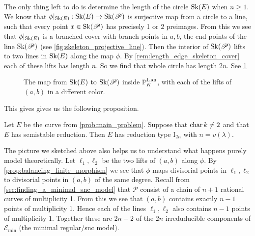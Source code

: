 The only thing left to do is determine the length of the circle $\operatorname{Sk}(E)$ when $n \ge 1$.
We know that $\phi|_{\sk(E)}:\sk (E) \to \sk(\mathscr P)$ is surjective map from a circle to a line, such that every point $x \in \operatorname{Sk}(\mathscr P)$ has precisely 1 or 2 preimages. 
From this we see that $\phi|_{\sk(E)}$ is a branched cover with branch points in $a, b$, the end points of the line $\operatorname{Sk}(\mathscr P)$ (see \cref{fig:skeleton_projective_line}).
Then the interior of $\operatorname{Sk}(\mathscr P)$ lifts to two lines in $\mathscr  {\operatorname{Sk}}(E)$ along the map $\phi$.
By \cref{rem:length_edge_skeleton_cover} each of these lifts has length $n$. 
So we find that whole circle has length $2n$. 
See \cref{fig:map_circle_line}
\begin{figure}[ht]
    \centering
    \caption{The map from $\operatorname{Sk}(E)$ to $\operatorname{Sk}(\mathscr P)$ inside $\mathbb{P}^{1, \text{an}}_K$, with each of the lifts of $(a, b)$ in a different color.}
    \label{fig:map_circle_line}
\end{figure}
This gives gives us the following proposition.
\begin{proposition}
	Let $E$ be the curve from \cref{prob:main_problem}. 
	Suppose that $\operatorname{char} k \ne 2$ and that $E$ has semistable reduction. 
	Then $E$ has reduction type $\mathrm I_{2n}$ with $n = v(\lambda)$. 
\end{proposition}

The picture we sketched above also helps us to understand what happens purely model theoretically. 
Let $\ell_1, \ell_2$ be the two lifts of $(a, b)$ along $\phi$. 
By \cref{prop:balancing_finite_morphism} we see that $\phi$ maps divisorial points in $\ell_1, \ell_2$ to divisorial points in $(a, b)$ of the same degree. 
Recall from \cref{sec:finding_a_minimal_snc_model} that $\mathscr P$ consist of a chain of $n+1$ rational curves of multiplicity 1. 
From this we see that $(a, b)$ contains exactly $n -1$ points of multiplicity 1. 
Hence each of the lines $\ell_1, \ell_2$ also contains $n-1$ points of multiplicity 1.
Together these are $2n - 2$ of the  $2n$ irreduducible components of $\mathscr E_\text{min} $ (the minimal regular/snc model). 

